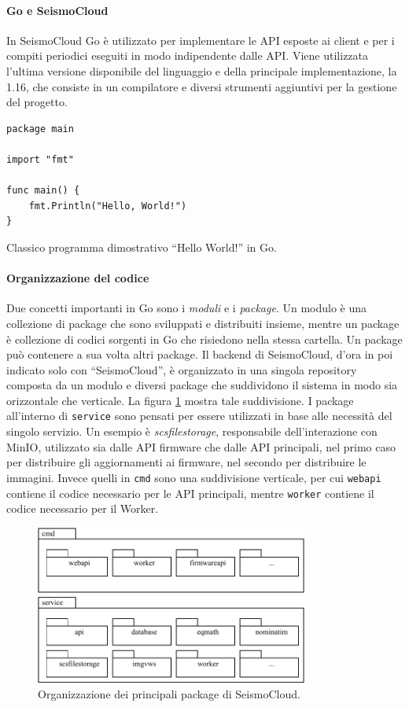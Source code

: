 \paragraph{Go e SeismoCloud} In SeismoCloud Go è utilizzato per implementare le API esposte ai client e per i compiti periodici eseguiti in modo indipendente dalle API. Viene utilizzata l'ultima versione disponibile del linguaggio e della principale implementazione, la 1.16, che consiste in un compilatore e diversi strumenti aggiuntivi per la gestione del progetto.

\begin{listing}
\begin{verbatim}
package main

import "fmt"

func main() {
	fmt.Println("Hello, World!")
}
\end{verbatim}
\caption{Classico programma dimostrativo ``Hello World!'' in Go.}
\label{listing:hello_world}
\end{listing}

\paragraph{Organizzazione del codice} Due concetti importanti in Go sono i \textit{moduli} e i \textit{package}. Un modulo è una collezione di package che sono sviluppati e distribuiti insieme, mentre un package è collezione di codici sorgenti in Go che risiedono nella stessa cartella. Un package può contenere a sua volta altri package. Il backend di SeismoCloud, d'ora in poi indicato solo con ``SeismoCloud'', è organizzato in una singola repository composta da un modulo e diversi package che suddividono il sistema in modo sia orizzontale che verticale. La figura \ref{fig:repository} mostra tale suddivisione. I package all'interno di \texttt{service} sono pensati per essere utilizzati in base alle necessità del singolo servizio. Un esempio è \textit{scsfilestorage}, responsabile dell'interazione con MinIO, utilizzato sia dalle API firmware che dalle API principali, nel primo caso per distribuire gli aggiornamenti ai firmware, nel secondo per distribuire le immagini. Invece quelli in \texttt{cmd} sono una suddivisione verticale, per cui \texttt{webapi} contiene il codice necessario per le API principali, mentre \texttt{worker} contiene il codice necessario per il Worker.

\begin{figure}[ht!]
\centering
\includegraphics[width=0.8\textwidth]{assets/04/repository.pdf}
\caption{Organizzazione dei principali package di SeismoCloud.}
\label{fig:repository}
\end{figure}

